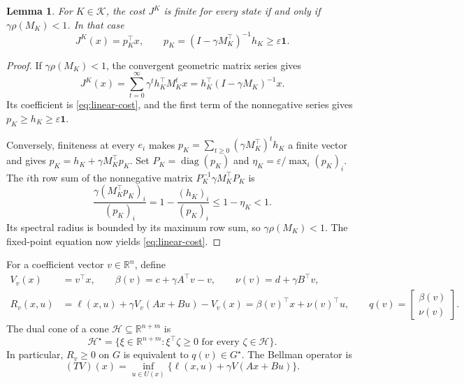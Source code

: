 \documentclass[10pt]{article}
\newtheorem{lemma}{Lemma}
\newcommand{\R}{\mathbb R}
\newcommand{\one}{\mathbf 1}
\DeclareMathOperator{\diag}{diag}
\begin{document}
\begin{lemma}
\label{lem:linear-cost}
For $K\in\mathcal K$, the cost $J^K$ is finite for every state if and only if $\gamma\rho(M_K)<1$. In that case
\begin{equation}
 J^K(x)=p_K^\top x,\qquad
 p_K=(I-\gamma M_K^\top)^{-1}h_K\ge\varepsilon\one.
 \label{eq:linear-cost}
\end{equation}
\end{lemma}
\begin{proof}
If $\gamma\rho(M_K)<1$, the convergent geometric matrix series gives
\[
 J^K(x)=\sum_{t=0}^\infty\gamma^t h_K^\top M_K^t x
 =h_K^\top(I-\gamma M_K)^{-1}x.
\]
Its coefficient is \eqref{eq:linear-cost}, and the first term of the nonnegative series gives $p_K\ge h_K\ge\varepsilon\one$.

Conversely, finiteness at every $e_i$ makes $p_K=\sum_{t\ge0}(\gamma M_K^\top)^t h_K$ a finite vector and gives $p_K=h_K+\gamma M_K^\top p_K$. Set $P_K=\diag(p_K)$ and $\eta_K=\varepsilon/\max_i(p_K)_i$. The $i$th row sum of the nonnegative matrix $P_K^{-1}\gamma M_K^\top P_K$ is
\[
 \frac{\gamma(M_K^\top p_K)_i}{(p_K)_i}
 =1-\frac{(h_K)_i}{(p_K)_i}
 \le1-\eta_K<1.
\]
Its spectral radius is bounded by its maximum row sum, so $\gamma\rho(M_K)<1$. The fixed-point equation now yields \eqref{eq:linear-cost}.
\end{proof}

For a coefficient vector $v\in\R^n$, define
\begin{align}
 V_v(x)&=v^\top x,\qquad
 \beta(v)=c+\gamma A^\top v-v,\qquad
 \nu(v)=d+\gamma B^\top v,\nonumber\\
 R_v(x,u)&=\ell(x,u)+\gamma V_v(Ax+Bu)-V_v(x)
           =\beta(v)^\top x+\nu(v)^\top u,\qquad
 q(v)=\begin{bmatrix}\beta(v)\\\nu(v)\end{bmatrix}.
 \label{eq:residual}
\end{align}
The dual cone of a cone $\mathcal H\subseteq\R^{n+m}$ is
\begin{equation}
 \mathcal H^\star=\{\xi\in\R^{n+m}:\xi^\top\zeta\ge0
       \text{ for every }\zeta\in\mathcal H\}.
 \label{eq:dual}
\end{equation}
In particular, $R_v\ge0$ on $G$ is equivalent to $q(v)\in G^\star$. The Bellman operator is
\begin{equation}
 (TV)(x)=\inf_{u\in U(x)}\{\ell(x,u)+\gamma V(Ax+Bu)\}.
 \label{eq:bellman}
\end{equation}
\end{document}
